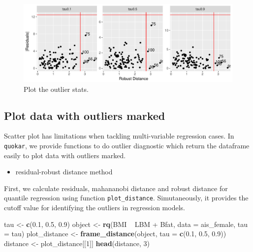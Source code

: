 \documentclass[11pt,a4paper,]{article}
\newenvironment{Shaded}{\begin{snugshade}}{\end{snugshade}}
\newcommand{\KeywordTok}[1]{\textcolor[rgb]{0.13,0.29,0.53}{\textbf{{#1}}}}
\newcommand{\DataTypeTok}[1]{\textcolor[rgb]{0.13,0.29,0.53}{{#1}}}
\newcommand{\DecValTok}[1]{\textcolor[rgb]{0.00,0.00,0.81}{{#1}}}
\newcommand{\FloatTok}[1]{\textcolor[rgb]{0.00,0.00,0.81}{{#1}}}
\newcommand{\StringTok}[1]{\textcolor[rgb]{0.31,0.60,0.02}{{#1}}}
\newcommand{\NormalTok}[1]{{#1}}
\providecommand{\tightlist}{%
  \setlength{\itemsep}{0pt}\setlength{\parskip}{0pt}}
\theoremstyle{definition}
\theoremstyle{definition}
\theoremstyle{remark}
\begin{document}
\begin{figure}

{\centering \includegraphics{Diagnosing_outliers_and_visualization_of_quantile_regression_models_files/figure-latex/unnamed-chunk-4-1} 

}

\caption{Plot the outlier stats.}\label{fig:unnamed-chunk-4}
\end{figure}

\subsection{Plot data with outliers
marked}\label{plot-data-with-outliers-marked}

Scatter plot has limitations when tackling multi-variable regression
cases. In \texttt{quokar}, we provide functions to do outlier diagnostic
which return the dataframe easily to plot data with outliers marked.

\begin{itemize}
\tightlist
\item
  residual-robust distance method
\end{itemize}

First, we calculate residuals, mahananobi distance and robust distance
for quantile regression using function \texttt{plot\_distance}.
Simutaneously, it provides the cutoff value for identifying the outliers
in regression models.

\begin{Shaded}
\begin{Highlighting}[]
\NormalTok{tau <-}\StringTok{ }\KeywordTok{c}\NormalTok{(}\FloatTok{0.1}\NormalTok{, }\FloatTok{0.5}\NormalTok{, }\FloatTok{0.9}\NormalTok{)}
\NormalTok{object <-}\StringTok{ }\KeywordTok{rq}\NormalTok{(BMI ~}\StringTok{ }\NormalTok{LBM +}\StringTok{ }\NormalTok{Bfat, }\DataTypeTok{data =} \NormalTok{ais_female, }\DataTypeTok{tau =} \NormalTok{tau)}
\NormalTok{plot_distance <-}\StringTok{ }\KeywordTok{frame_distance}\NormalTok{(object, }\DataTypeTok{tau =} \KeywordTok{c}\NormalTok{(}\FloatTok{0.1}\NormalTok{, }\FloatTok{0.5}\NormalTok{, }\FloatTok{0.9}\NormalTok{))}
\NormalTok{distance <-}\StringTok{ }\NormalTok{plot_distance[[}\DecValTok{1}\NormalTok{]]}
\KeywordTok{head}\NormalTok{(distance, }\DecValTok{3}\NormalTok{)}
\end{Highlighting}
\end{Shaded}
\end{document}
